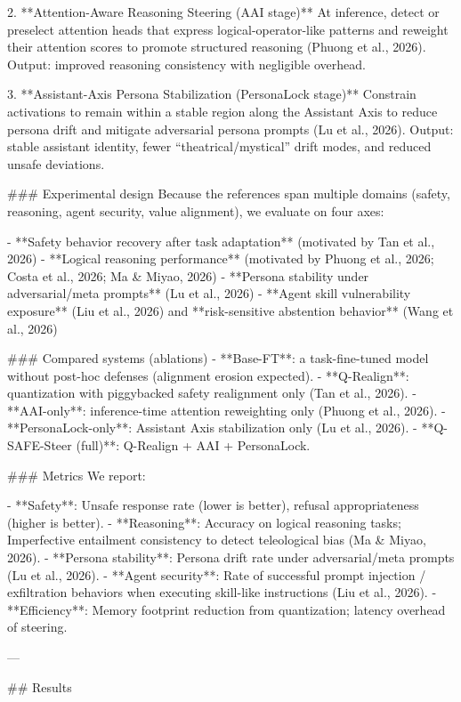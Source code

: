 2. **Attention-Aware Reasoning Steering (AAI stage)**  
   At inference, detect or preselect attention heads that express logical-operator-like patterns and reweight their attention scores to promote structured reasoning (Phuong et al., 2026). Output: improved reasoning consistency with negligible overhead.

3. **Assistant-Axis Persona Stabilization (PersonaLock stage)**  
   Constrain activations to remain within a stable region along the Assistant Axis to reduce persona drift and mitigate adversarial persona prompts (Lu et al., 2026). Output: stable assistant identity, fewer “theatrical/mystical” drift modes, and reduced unsafe deviations.

### Experimental design  
Because the references span multiple domains (safety, reasoning, agent security, value alignment), we evaluate on four axes:

- **Safety behavior recovery after task adaptation** (motivated by Tan et al., 2026)  
- **Logical reasoning performance** (motivated by Phuong et al., 2026; Costa et al., 2026; Ma & Miyao, 2026)  
- **Persona stability under adversarial/meta prompts** (Lu et al., 2026)  
- **Agent skill vulnerability exposure** (Liu et al., 2026) and **risk-sensitive abstention behavior** (Wang et al., 2026)

### Compared systems (ablations)  
- **Base-FT**: a task-fine-tuned model without post-hoc defenses (alignment erosion expected).  
- **Q-Realign**: quantization with piggybacked safety realignment only (Tan et al., 2026).  
- **AAI-only**: inference-time attention reweighting only (Phuong et al., 2026).  
- **PersonaLock-only**: Assistant Axis stabilization only (Lu et al., 2026).  
- **Q-SAFE-Steer (full)**: Q-Realign + AAI + PersonaLock.

### Metrics  
We report:

- **Safety**: Unsafe response rate (lower is better), refusal appropriateness (higher is better).  
- **Reasoning**: Accuracy on logical reasoning tasks; Imperfective entailment consistency to detect teleological bias (Ma & Miyao, 2026).  
- **Persona stability**: Persona drift rate under adversarial/meta prompts (Lu et al., 2026).  
- **Agent security**: Rate of successful prompt injection / exfiltration behaviors when executing skill-like instructions (Liu et al., 2026).  
- **Efficiency**: Memory footprint reduction from quantization; latency overhead of steering.

---

## Results  

